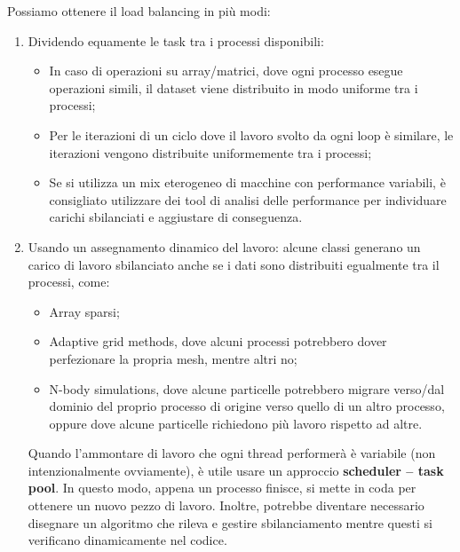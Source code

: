 Possiamo ottenere il load balancing in più modi:
\begin{enumerate}
    \item Dividendo equamente le task tra i processi disponibili:
    \begin{itemize}
        \item In caso di operazioni su array/matrici, dove ogni processo esegue operazioni simili, il dataset viene distribuito in modo uniforme tra i processi;
        \item Per le iterazioni di un ciclo dove il lavoro svolto da ogni loop è similare, le iterazioni vengono distribuite uniformemente tra i processi;
        \item Se si utilizza un mix eterogeneo di macchine con performance variabili, è consigliato utilizzare dei tool di analisi delle performance per individuare carichi sbilanciati e aggiustare di conseguenza.
    \end{itemize}
    \item Usando un assegnamento dinamico del lavoro: alcune classi generano un carico di lavoro sbilanciato anche se i dati sono distribuiti egualmente tra il processi, come:
    \begin{itemize}
        \item Array sparsi;
        \item Adaptive grid methods, dove alcuni processi potrebbero dover perfezionare la propria mesh, mentre altri no;
        \item N-body simulations, dove alcune particelle potrebbero migrare verso/dal dominio del proprio processo di origine verso quello di un altro processo, oppure dove alcune particelle richiedono più lavoro rispetto ad altre.
    \end{itemize}
    Quando l'ammontare di lavoro che ogni thread performerà è variabile (non intenzionalmente ovviamente), è utile usare un approccio \textbf{scheduler – task pool}. In questo modo, appena un processo finisce, si mette in coda per ottenere un nuovo pezzo di lavoro.
    Inoltre, potrebbe diventare necessario disegnare un algoritmo che rileva e gestire sbilanciamento mentre questi si verificano dinamicamente nel codice.
\end{enumerate}

